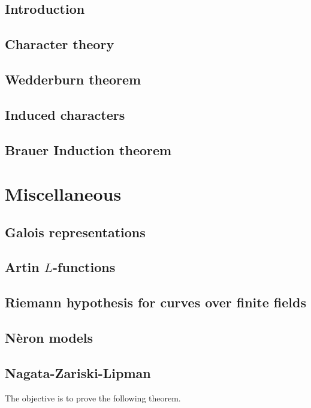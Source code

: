 \documentclass[oneside, 12pt]{scrbook}
\theoremstyle{theorem}
\begin{document}
\chapter{Introduction}

\chapter{Character theory}

\chapter{Wedderburn theorem}

\chapter{Induced characters}

\chapter{Brauer Induction theorem}



\part{Miscellaneous}

\chapter{Galois representations}

\chapter{Artin $L$-functions}

\chapter{Riemann hypothesis for curves over finite fields}

\chapter{N\`{e}ron models}

\chapter{Nagata-Zariski-Lipman}

The objective is to prove the following theorem.
\end{document}
